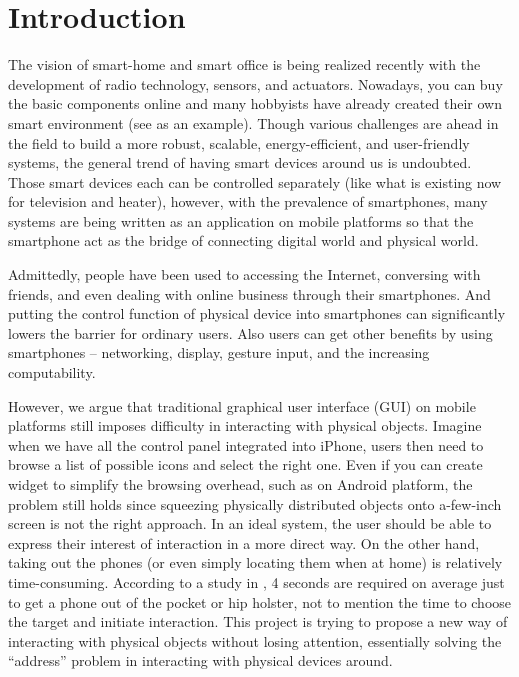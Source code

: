 \section{Introduction}
\label{sec:introduction}

The vision of smart-home and smart office is being realized recently with the development of radio technology, sensors, and actuators. Nowadays, you can buy the basic components online \cite{SmartHome, NinjaBlocks} and many hobbyists have already created their own smart environment (see \cite{BRAD} as an example). Though various challenges are ahead in the field to build a more robust, scalable, energy-efficient, and user-friendly systems, the general trend of having smart devices around us is undoubted. Those smart devices each can be controlled separately (like what is existing now for television and heater), however, with the prevalence of smartphones, many systems \cite{SmartThings, Lockitron} are being written as an application on mobile platforms so that the smartphone act as the bridge of connecting digital world and physical world.

Admittedly, people have been used to accessing the Internet, conversing with friends, and even dealing with online business through their smartphones. And putting the control function of physical device into smartphones can significantly lowers the barrier for ordinary users. Also users can get other benefits by using smartphones -- networking,  display, gesture input, and the increasing computability. 

However, we argue that traditional graphical user interface (GUI) on mobile platforms still imposes difficulty in interacting with physical objects. Imagine when we have all the control panel integrated into iPhone, users then need to browse a list of possible icons and select the right one. Even if you can create widget to simplify the browsing overhead, such as on Android platform, the problem still holds since squeezing physically distributed objects onto a-few-inch screen is not the right approach. In an ideal system, the user should be able to express their interest of interaction in a more direct way. On the other hand, taking out the phones (or even simply locating them when at home) is relatively time-consuming. According to a study in \cite{Ashbrook:2008:QIM:1357054.1357092}, 4 seconds are required on average just to get a phone out of the pocket or hip holster, not to mention the time to choose the target and initiate interaction. This project is trying to propose a new way of interacting with physical objects without losing attention, essentially solving the ``address'' problem in interacting with physical devices around.

